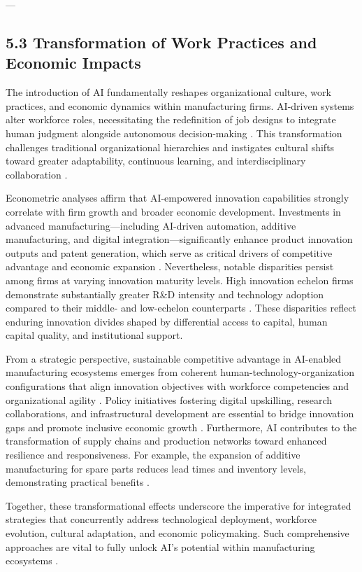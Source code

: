 \documentclass[11pt]{article}
\begin{document}
---

\subsection{5.3 Transformation of Work Practices and Economic Impacts}

The introduction of AI fundamentally reshapes organizational culture, work practices, and economic dynamics within manufacturing firms. AI-driven systems alter workforce roles, necessitating the redefinition of job designs to integrate human judgment alongside autonomous decision-making \cite{ref19}. This transformation challenges traditional organizational hierarchies and instigates cultural shifts toward greater adaptability, continuous learning, and interdisciplinary collaboration \cite{ref20}.

Econometric analyses affirm that AI-empowered innovation capabilities strongly correlate with firm growth and broader economic development. Investments in advanced manufacturing—including AI-driven automation, additive manufacturing, and digital integration—significantly enhance product innovation outputs and patent generation, which serve as critical drivers of competitive advantage and economic expansion \cite{ref21}. Nevertheless, notable disparities persist among firms at varying innovation maturity levels. High innovation echelon firms demonstrate substantially greater R&D intensity and technology adoption compared to their middle- and low-echelon counterparts \cite{ref28}. These disparities reflect enduring innovation divides shaped by differential access to capital, human capital quality, and institutional support.

From a strategic perspective, sustainable competitive advantage in AI-enabled manufacturing ecosystems emerges from coherent human-technology-organization configurations that align innovation objectives with workforce competencies and organizational agility \cite{ref36}. Policy initiatives fostering digital upskilling, research collaborations, and infrastructural development are essential to bridge innovation gaps and promote inclusive economic growth \cite{ref38}. Furthermore, AI contributes to the transformation of supply chains and production networks toward enhanced resilience and responsiveness. For example, the expansion of additive manufacturing for spare parts reduces lead times and inventory levels, demonstrating practical benefits \cite{ref9}.

Together, these transformational effects underscore the imperative for integrated strategies that concurrently address technological deployment, workforce evolution, cultural adaptation, and economic policymaking. Such comprehensive approaches are vital to fully unlock AI’s potential within manufacturing ecosystems \cite{ref19}.
\end{document}

